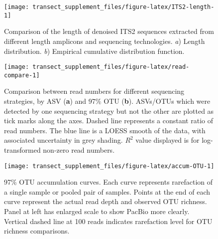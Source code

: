 \documentclass[
]{article}
\begin{document}
\begin{figure}

{\centering \texttt{[image: transect\_supplement\_files/figure-latex/ITS2-length-1]} 

}

\caption[Comparison of the length of denoised ITS2 sequences extracted from different length amplicons and sequencing technologies]{Comparison of the length of denoised ITS2 sequences extracted from different length amplicons and sequencing technologies. \emph{a}) Length distribution. \emph{b}) Empirical cumulative distribution function.}\label{fig:ITS2-length}
\end{figure}





\begin{figure}

{\centering \texttt{[image: transect\_supplement\_files/figure-latex/read-compare-1]} 

}

\caption[Comparison between read numbers for different sequencing strategies]{Comparison between read numbers for different sequencing strategies, by ASV (\textbf{a}) and 97\% OTU (\textbf{b}). ASVs/OTUs which were detected by one sequencing strategy but not the other are plotted as tick marks along the axes. Dashed line represents a constant ratio of read numbers. The blue line is a LOESS smooth of the data, with associated uncertainty in grey shading. \(R^2\) value displayed is for log-transformed non-zero read numbers.}\label{fig:read-compare}
\end{figure}








\begin{figure}

{\centering \texttt{[image: transect\_supplement\_files/figure-latex/accum-OTU-1]} 

}

\caption[97\% OTU accumulation curves]{97\% OTU accumulation curves. Each curve represents rarefaction of a single sample or pooled pair of samples.
Points at the end of each curve represent the actual read depth and observed OTU richness.
Panel at left has enlarged scale to show PacBio more clearly.
Vertical dashed line at 100 reads indicates rarefaction level for OTU richness comparisons.}\label{fig:accum-OTU}
\end{figure}
\end{document}
